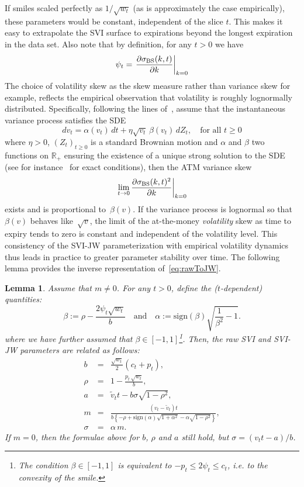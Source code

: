 \documentclass[12pt]{article}
\newtheorem{lemma}{Lemma}[section]
\numberwithin{equation}{section}
\newcommand{\BS}{\rm BS}
\newcommand{\sgn}{\mathrm{sign}}
\begin{document}
If smiles scaled perfectly as $1/\sqrt{w_t}$ (as is approximately the case empirically), these parameters would be constant, independent of the slice $t$.  
This makes it easy to extrapolate the SVI surface to expirations beyond the longest expiration in the data set.
Also note that by definition, for any $t>0$ we have
\[
\psi_t=\left.\frac{\partial \sigma_{\BS}(k,t)}{\partial k}\right|_{k=0}
\]
The choice of volatility skew as the skew measure rather than variance skew for example, reflects the empirical observation that volatility is roughly lognormally distributed.
Specifically, following the lines of~\cite[Chapter 7]{jimbook}, assume that the instantaneous variance process satisfies the SDE
\[
 dv_t = \alpha (v_t)\,dt   + \eta \sqrt{v_t}\,\beta(v_t)\, dZ_t,
\quad \text{for all }t\geq 0
\]
where $\eta>0$, $(Z_t)_{t\geq 0}$ is a standard Brownian motion
and $\alpha$ and $\beta$ two functions on $\mathbb{R}_+$ ensuring the existence of a unique strong solution to the SDE
(see for instance~\cite{KarSh} for exact conditions),
then the ATM variance skew
$$
\left.\lim_{t\to 0}\frac{\partial \sigma_{\BS}(k,t)^2} {\partial k}\right|_{k=0}
$$
exists and is proportional to~$\beta(v)$. 
If the variance process is lognormal so that~$\beta(v)$ behaves like~$\sqrt{v}$, the limit of the at-the-money {\em volatility} skew as time to expiry tends to zero is constant and independent of the volatility level.
This consistency of the SVI-JW parameterization with empirical volatility dynamics thus leads in practice to greater parameter stability over time.
The following lemma provides the inverse representation of~\eqref{eq:rawToJW}.
\begin{lemma}\label{lem:SVIJWtoSVI}
Assume that $m\ne 0$.
For any $t>0$, define the ($t$-dependent) quantities:
$$
\beta := \rho-\frac{2\psi_t\sqrt{w_t}}{b}
\quad\text{and}\quad
\alpha := \sgn(\beta)\sqrt{\frac{1}{\beta^2}-1}.
$$
where we have further assumed that $\beta \in [-1,1]$\footnote{The condition $\beta \in [-1,1]$ is equivalent to $-p_t \leq 2\psi_t \leq c_t$, i.e. to the convexity of the smile.}.
Then, the raw SVI and SVI-JW parameters are related as follows:
\begin{eqnarray*}
b&=&\frac{\sqrt{w_t}}{2}\left(c_t+p_t\right),\\
\rho&=&1-\frac{p_t\,\sqrt{w_t}}{b},\\
a&=&\widetilde v_{t}t-b\sigma\sqrt{1-\rho^2},\\
m &=&
\frac{\left(v_t-\widetilde v_{t}\right)t}{b\left\{-\rho+\sgn(\alpha)\sqrt{1+\alpha^2}-\alpha\sqrt{1-\rho^2}\right\}},
\\
\sigma&=& \alpha\, m.
\end{eqnarray*}
If $m=0$, then the formulae above for $b$, $\rho$ and $a$ still hold, but
$\sigma = \left(v_t t-a\right)/b$.
\end{lemma}
\end{document}
